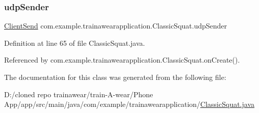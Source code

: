 \subsubsection{\texorpdfstring{udpSender}{udpSender}}
{\footnotesize\ttfamily \mbox{\hyperlink{classcom_1_1example_1_1trainawearapplication_1_1_client_send}{Client\+Send}} com.\+example.\+trainawearapplication.\+Classic\+Squat.\+udp\+Sender\hspace{0.3cm}{\ttfamily [private]}}



Definition at line 65 of file Classic\+Squat.\+java.



Referenced by com.\+example.\+trainawearapplication.\+Classic\+Squat.\+on\+Create().



The documentation for this class was generated from the following file\+:\begin{DoxyCompactItemize}
\item 
D\+:/cloned repo trainawear/train-\/\+A-\/wear/\+Phone App/app/src/main/java/com/example/trainawearapplication/\mbox{\hyperlink{_classic_squat_8java}{Classic\+Squat.\+java}}\end{DoxyCompactItemize}

